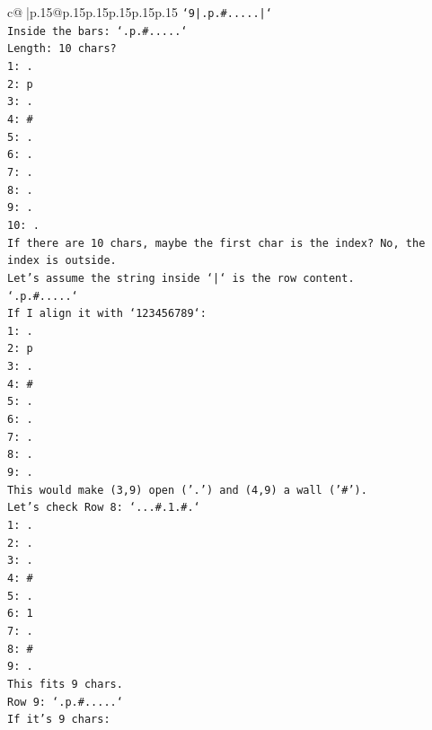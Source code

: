 \documentclass{article}
\begin{document}
{\begin{supertabular}{c@{$\;$}|p{.15\linewidth}@{}p{.15\linewidth}p{.15\linewidth}p{.15\linewidth}p{.15\linewidth}p{.15\linewidth}}
{{{\texttt{`9|.p.\#.....|`} \\
\texttt{Inside the bars: `.p.\#.....`} \\
\texttt{Length: 10 chars?} \\
\texttt{1: .} \\
\texttt{2: p} \\
\texttt{3: .} \\
\texttt{4: \#} \\
\texttt{5: .} \\
\texttt{6: .} \\
\texttt{7: .} \\
\texttt{8: .} \\
\texttt{9: .} \\
\texttt{10: .} \\
\texttt{If there are 10 chars, maybe the first char is the index? No, the index is outside.} \\
\texttt{Let's assume the string inside `|` is the row content.} \\
\texttt{`.p.\#.....`} \\
\texttt{If I align it with `123456789`:} \\
\texttt{1: .} \\
\texttt{2: p} \\
\texttt{3: .} \\
\texttt{4: \#} \\
\texttt{5: .} \\
\texttt{6: .} \\
\texttt{7: .} \\
\texttt{8: .} \\
\texttt{9: .} \\
\texttt{This would make (3,9) open ('.') and (4,9) a wall ('\#').} \\
\texttt{Let's check Row 8: `...\#.1.\#.`} \\
\texttt{1: .} \\
\texttt{2: .} \\
\texttt{3: .} \\
\texttt{4: \#} \\
\texttt{5: .} \\
\texttt{6: 1} \\
\texttt{7: .} \\
\texttt{8: \#} \\
\texttt{9: .} \\
\texttt{This fits 9 chars.} \\
\texttt{Row 9: `.p.\#.....`} \\
\texttt{If it's 9 chars:} \\
}}}
\end{supertabular}}
\end{document}
